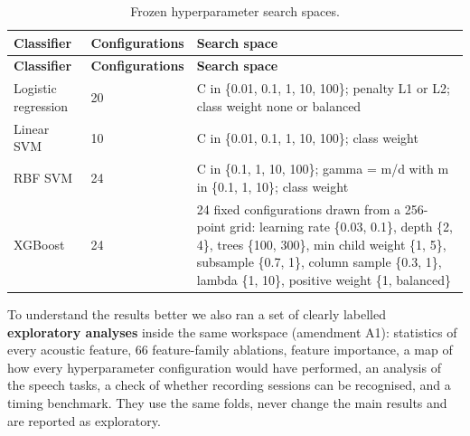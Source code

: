 \documentclass[11pt,a4paper]{article}
\begin{document}
\begin{center}\small\renewcommand{\arraystretch}{1.15}
\begin{longtable}{>{\raggedright\arraybackslash}p{2.98cm}>{\raggedleft\arraybackslash}p{1.55cm}>{\raggedright\arraybackslash}p{10.71cm}}
\caption{Frozen hyperparameter search spaces.}\\
\toprule
\textbf{\hspace{0pt}Classifier} & \textbf{\hspace{0pt}Configurations} & \textbf{\hspace{0pt}Search space}\\\midrule\endfirsthead
\toprule
\textbf{\hspace{0pt}Classifier} & \textbf{\hspace{0pt}Configurations} & \textbf{\hspace{0pt}Search space}\\\midrule\endhead
\bottomrule\endfoot
\hspace{0pt}Logistic regression & \hspace{0pt}20 & \hspace{0pt}C in \{0.01, 0.1, 1, 10, 100\}; penalty L1 or L2; class weight none or balanced\\
\hspace{0pt}Linear SVM & \hspace{0pt}10 & \hspace{0pt}C in \{0.01, 0.1, 1, 10, 100\}; class weight\\
\hspace{0pt}RBF SVM & \hspace{0pt}24 & \hspace{0pt}C in \{0.1, 1, 10, 100\}; gamma = m/\allowbreak{}d with m in \{0.1, 1, 10\}; class weight\\
\hspace{0pt}XGBoost & \hspace{0pt}24 & \hspace{0pt}24 fixed configurations drawn from a 256-point grid: learning rate \{0.03, 0.1\}, depth \{2, 4\}, trees \{100, 300\}, min child weight \{1, 5\}, subsample \{0.7, 1\}, column sample \{0.3, 1\}, lambda \{1, 10\}, positive weight \{1, balanced\}\\
\end{longtable}\end{center}
To understand the results better we also ran a set of clearly labelled \textbf{exploratory analyses} inside the same workspace (amendment A1): statistics of every acoustic feature, 66 feature-family ablations, feature importance, a map of how every hyperparameter configuration would have performed, an analysis of the speech tasks, a check of whether recording sessions can be recognised, and a timing benchmark. They use the same folds, never change the main results and are reported as exploratory.
\end{document}
